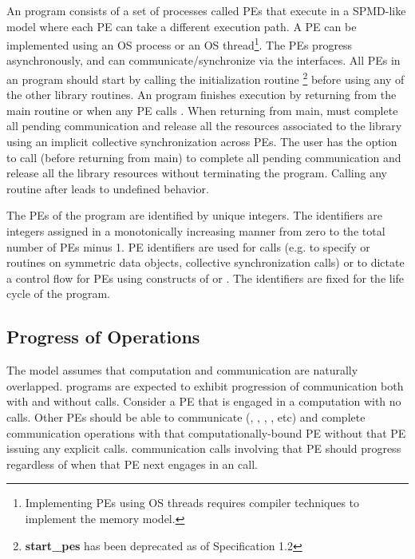 An \openshmem program consists of a set of \openshmem processes called \ac{PE}s
that execute in a \ac{SPMD}-like model where each \ac{PE} can take a different
execution path. A \ac{PE} can be implemented using an OS process or an OS
thread\footnote{Implementing \ac{PE}s using OS threads requires compiler
techniques to implement the \openshmem memory model.}.  The \ac{PE}s progress
asynchronously, and can communicate/synchronize via the \openshmem interfaces.
All \ac{PE}s in an \openshmem program should start by calling the initialization
routine   \footnote{\textbf{start\_pes} has been
deprecated as of Specification 1.2} before using any of the other \openshmem
library routines.  An \openshmem program finishes execution by returning from
the main routine or when any PE calls . When returning
from main, \openshmem must complete all pending communication and release all
the resources associated to the library using an implicit collective
synchronization across PEs. The user has the option to call
 (before returning from main) to complete all pending
communication and release all the \openshmem library resources without
terminating the program. Calling any \openshmem routine after
 leads to undefined behavior.

The \ac{PE}s of the \openshmem program are identified by unique integers.  The
identifiers are integers assigned in a monotonically increasing manner from zero
to the total number of \ac{PE}s minus 1. \ac{PE} identifiers are used for
\openshmem calls (e.g. to specify  or  routines on symmetric
data objects, collective synchronization calls) or to dictate a control flow for
\ac{PE}s using constructs of \Clang{} or \Fortran. The identifiers are fixed for
the life cycle of the \openshmem program.

\subsection{Progress of \openshmem Operations}\label{subsec:progress}

The \openshmem model assumes that computation and communication are naturally
overlapped. \openshmem programs are expected to exhibit progression of
communication both with and without \openshmem calls. Consider a \ac{PE} that is
engaged in a computation with no \openshmem calls. Other \ac{PE}s should be able
to communicate (, , , , etc) and
complete communication operations with that computationally-bound \ac{PE}
without that \ac{PE} issuing any explicit \openshmem calls. \openshmem
communication calls involving that \ac{PE} should progress regardless of when
that \ac{PE} next engages in an \openshmem call.

